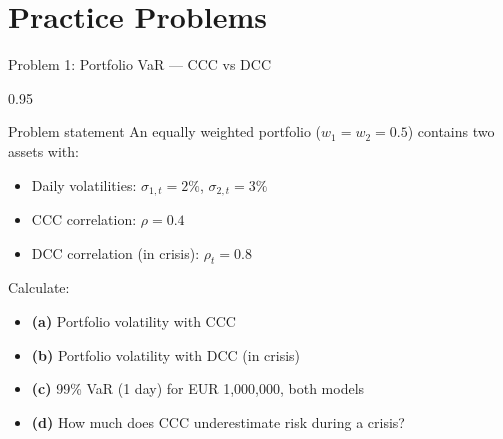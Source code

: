 \documentclass[9pt, aspectratio=169, t]{beamer}
\begin{document}
\section{Practice Problems}

\begin{frame}{Problem 1: Portfolio VaR --- CCC vs DCC}
    \begin{cminipage}{0.95\textwidth}
    \begin{block}{Problem statement}
        An equally weighted portfolio ($w_1 = w_2 = 0.5$) contains two assets with:
        \begin{itemize}\setlength{\itemsep}{0pt}
            \item Daily volatilities: $\sigma_{1,t} = 2\%$, $\sigma_{2,t} = 3\%$
            \item CCC correlation: $\rho = 0.4$
            \item DCC correlation (in crisis): $\rho_t = 0.8$
        \end{itemize}

        \vspace{0.3cm}
        Calculate:
        \begin{itemize}\setlength{\itemsep}{0pt}
            \item \textbf{(a)} Portfolio volatility with CCC
            \item \textbf{(b)} Portfolio volatility with DCC (in crisis)
            \item \textbf{(c)} 99\% VaR (1 day) for EUR 1,000,000, both models
            \item \textbf{(d)} How much does CCC underestimate risk during a crisis?
        \end{itemize}
    \end{block}
    \end{cminipage}
\end{frame}
\end{document}
